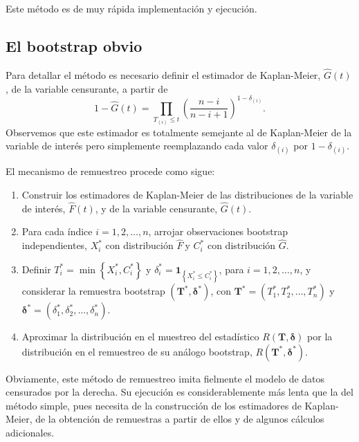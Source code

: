 \documentclass[
]{book}
\renewcommand{\boldsymbol}[1]{\symbf{#1}}
\renewcommand{\mathbf}[1]{\symbf{#1}}
\theoremstyle{break}
\theoremstyle{nonumberplain}
\begin{document}
Este método es de muy rápida implementación y ejecución.

\subsection{El bootstrap obvio}\label{bootcen-obvio}

Para detallar el método es necesario definir el estimador de
Kaplan-Meier, \(\hat{G}\left( t \right)\), de la variable censurante, a
partir
de\[1-\hat{G}\left( t \right) =\prod_{T_{(i)}\leq t}\left( \frac{n-i
}{n-i+1} \right)^{1-\delta _{(i)}}.\] Observemos que este
estimador es totalmente semejante al de Kaplan-Meier de la variable de
interés pero simplemente reemplazando cada valor
\(\delta _{(i)}\) por \(1-\delta _{(i)}\).

El mecanismo de remuestreo procede como sigue:

\begin{enumerate}
\def\labelenumi{\arabic{enumi}.}
\item
  Construir los estimadores de Kaplan-Meier de las distribuciones de
  la variable de interés, \(\hat{F}\left( t \right)\), y de la variable
  censurante, \(\hat{G}\left( t \right)\).
\item
  Para cada índice \(i=1,2,\ldots ,n\), arrojar observaciones bootstrap
  independientes, \(X_i^{\ast}\) con distribución \(\hat{F}\ \)y
  \(C_i^{\ast}\) con distribución \(\hat{G}\).
\item
  Definir \(T_i^{\ast}=\min \left\{ X_i^{\ast},C_i^{\ast}\right\}\) y
  \(\delta_i^{\ast}=\mathbf{1}_{\left\{ X_i^{\ast}\leq
  C_i^{\ast}\right\}}\), para \(i = 1, 2, \ldots, n\),
  y considerar la remuestra bootstrap
  \(\left( \mathbf{T}^{\ast},\boldsymbol{\delta}^{\ast}\right)\), con
  \(\mathbf{T}^{\ast}=\left( T_1^{\ast},T_2^{\ast}, \ldots,
  T_n^{\ast} \right)\) y \(\boldsymbol{\delta}^{\ast} = \left(
  \delta_1^{\ast}, \delta_2^{\ast},\ldots ,\delta_n^{\ast} \right)\).
\item
  Aproximar la distribución en el muestreo del estadístico
  \(R\left( \mathbf{T},\boldsymbol{\delta} \right)\) por la
  distribución en el remuestreo de su análogo bootstrap, \(R\left(
  \mathbf{T}^{\ast},\boldsymbol{\delta}^{\ast} \right)\).
\end{enumerate}

Obviamente, este método de remuestreo imita fielmente el modelo de datos
censurados por la derecha. Su ejecución es considerablemente más lenta
que la del método simple, pues necesita de la construcción de los
estimadores de Kaplan-Meier, de la obtención de remuestras a partir de
ellos y de algunos cálculos adicionales.
\end{document}
